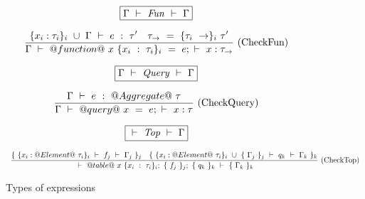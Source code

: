 \begin{figure*}
$$
\boxed{\Gamma ~\vdash~ \mathit{Fun} ~\vdash~ \Gamma}
$$

$$
\enskip \frac {\displaystyle 
  \{x_i:\tau_i\}_i~\cup~\Gamma ~\vdash~ e~:~\tau'
  \quad
  \tau_\to~=~\{\tau_i~\to\}_i~\tau'
} {\displaystyle 
  \Gamma ~\vdash~ @function@~x~\{x_i~:~\tau_i\}_i~=~e; ~\vdash~ x:\tau_\to
} \  \mbox{(CheckFun)} \enskip
$$

$$
\boxed{\Gamma ~\vdash~ \mathit{Query} ~\vdash~ \Gamma}
$$

$$
\enskip \frac {\displaystyle 
  \Gamma ~\vdash~ e~:~@Aggregate@~\tau
} {\displaystyle 
  \Gamma ~\vdash~ @query@~x~=~e; ~\vdash~ x:\tau
} \  \mbox{(CheckQuery)} \enskip
$$

$$
\boxed{ ~\vdash~ \mathit{Top} ~\vdash~ \Gamma}
$$

$$
\enskip \frac {\displaystyle 
  \{~\{x_i:@Element@~\tau_i\}_i ~\vdash~ f_j ~\vdash~ \Gamma_j~\}_j
  \quad
  \{~\{x_i:@Element@~\tau_i\}_i~\cup~\{~\Gamma_j~\}_j ~\vdash~ q_k ~\vdash~ \Gamma_k~\}_k
} {\displaystyle 
   ~\vdash~ 
      @table@
      ~x~\{x_i~:~\tau_i\}_i;
      ~\{~f_j~\}_j;
      ~\{~q_k~\}_k
     ~\vdash~ \{~\Gamma_k~\}_k
} \  \mbox{(CheckTop)} \enskip
$$


\caption{Types of expressions}
\label{fig:source:type:exp}
\end{figure*}

